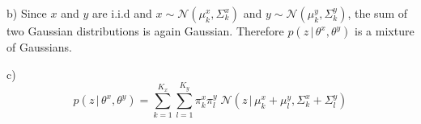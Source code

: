 %
\begin{flushleft}
b) Since $x$ and $y$ are i.i.d and $x \sim \mathcal{N}(\mu_k^x, \Sigma_k^x)$ and $y \sim \mathcal{N}(\mu_k^y, \Sigma_k^y)$, the sum of two Gaussian distributions is again Gaussian. Therefore $p(z \,|\, \theta^x, \theta^y)$ is a mixture of Gaussians.
\end{flushleft}
%
\begin{flushleft}
c) 
\[ p(z \,|\, \theta^x, \theta^y) = \sum_{k=1}^{K_x} \sum_{l=1}^{K_y} \pi_k^x \pi_l^y \; \mathcal{N}(z \,|\, \mu_k^x + \mu_l^y, \Sigma_k^x + \Sigma_l^y) \]
\end{flushleft}
%
%

%
%





